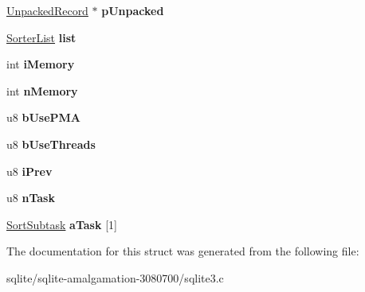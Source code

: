 \begin{DoxyCompactItemize}
\item 
\hypertarget{struct_vdbe_sorter_a0d85cdf1cf25c75cf90394d1bcfd27b9}{\hyperlink{struct_unpacked_record}{Unpacked\+Record} $\ast$ {\bfseries p\+Unpacked}}\label{struct_vdbe_sorter_a0d85cdf1cf25c75cf90394d1bcfd27b9}

\item 
\hypertarget{struct_vdbe_sorter_a5e4a486d8aba4b45e3b7000d0a3b2b5b}{\hyperlink{struct_sorter_list}{Sorter\+List} {\bfseries list}}\label{struct_vdbe_sorter_a5e4a486d8aba4b45e3b7000d0a3b2b5b}

\item 
\hypertarget{struct_vdbe_sorter_a32ec545e32e7b79fe8f72e15f4656786}{int {\bfseries i\+Memory}}\label{struct_vdbe_sorter_a32ec545e32e7b79fe8f72e15f4656786}

\item 
\hypertarget{struct_vdbe_sorter_a53740d50989018beadaff7fe814407f5}{int {\bfseries n\+Memory}}\label{struct_vdbe_sorter_a53740d50989018beadaff7fe814407f5}

\item 
\hypertarget{struct_vdbe_sorter_ae373cf1d1f102b34e005f0326f690bd7}{u8 {\bfseries b\+Use\+P\+M\+A}}\label{struct_vdbe_sorter_ae373cf1d1f102b34e005f0326f690bd7}

\item 
\hypertarget{struct_vdbe_sorter_aaf62cb4ac61aa2bcbf4ee00a2e12fe90}{u8 {\bfseries b\+Use\+Threads}}\label{struct_vdbe_sorter_aaf62cb4ac61aa2bcbf4ee00a2e12fe90}

\item 
\hypertarget{struct_vdbe_sorter_aa7cc8519f1b6d621de13fc383fb5478a}{u8 {\bfseries i\+Prev}}\label{struct_vdbe_sorter_aa7cc8519f1b6d621de13fc383fb5478a}

\item 
\hypertarget{struct_vdbe_sorter_a5a6475ca0a9de4321653a4afb4fcbef0}{u8 {\bfseries n\+Task}}\label{struct_vdbe_sorter_a5a6475ca0a9de4321653a4afb4fcbef0}

\item 
\hypertarget{struct_vdbe_sorter_abf5c3d717a20bf0ce713862f0c7b2653}{\hyperlink{struct_sort_subtask}{Sort\+Subtask} {\bfseries a\+Task} \mbox{[}1\mbox{]}}\label{struct_vdbe_sorter_abf5c3d717a20bf0ce713862f0c7b2653}

\end{DoxyCompactItemize}


The documentation for this struct was generated from the following file\+:\begin{DoxyCompactItemize}
\item 
sqlite/sqlite-\/amalgamation-\/3080700/sqlite3.\+c\end{DoxyCompactItemize}
